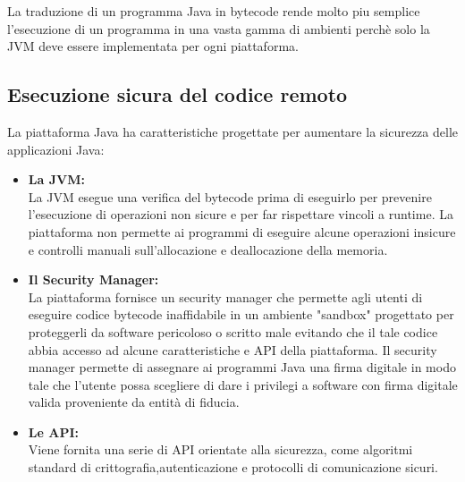 La traduzione di un programma Java in bytecode rende molto piu semplice l'esecuzione di un programma in una vasta gamma di ambienti perch\`e solo la JVM deve essere implementata per ogni piattaforma.
\subsection*{Esecuzione sicura del codice remoto}
La piattaforma Java ha caratteristiche progettate per aumentare la sicurezza delle applicazioni Java:
\begin{itemize}
\item \textbf{La JVM:}\\
La JVM esegue una verifica del bytecode prima di eseguirlo per prevenire l'esecuzione di operazioni non sicure e per far rispettare vincoli a runtime. La piattaforma non permette ai programmi di eseguire alcune operazioni insicure e controlli manuali sull'allocazione e deallocazione della memoria.
\item \textbf{Il Security Manager:}\\
La piattaforma fornisce un security manager che permette agli utenti di eseguire codice bytecode inaffidabile in un ambiente "sandbox" progettato per proteggerli da software pericoloso o scritto male evitando che il tale codice abbia accesso ad alcune caratteristiche e API della piattaforma.
Il security manager permette di assegnare ai programmi Java una firma digitale in modo tale che l'utente possa scegliere di dare i privilegi a software con firma digitale valida proveniente da entità di fiducia.
\item \textbf{Le API:}\\
Viene fornita una serie di API orientate alla sicurezza, come algoritmi standard di crittografia,autenticazione e protocolli di comunicazione sicuri.
\end{itemize}
